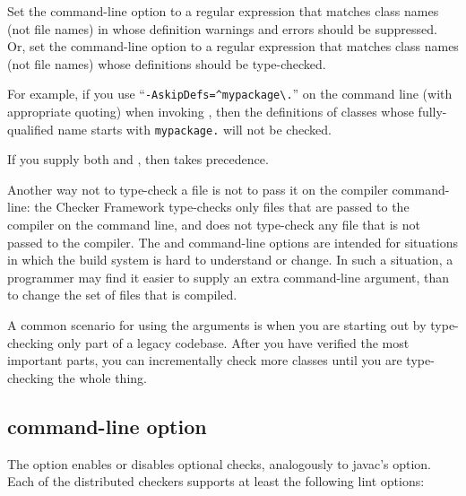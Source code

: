 Set the  command-line option to a
regular expression that matches class names (not file names) in whose definition warnings and errors
should be suppressed.
Or, set the  command-line option to a
regular expression that matches class names (not file names) whose
definitions should be type-checked.

For example, if you use
``{\codesize\verb|-AskipDefs=^mypackage\.|}'' on the command line
(with appropriate quoting) when invoking
, then the definitions of 
classes whose fully-qualified name starts with \codesize\verb|mypackage.|
will not be checked.

If you supply both  and , then
 takes precedence.

Another way not to type-check a file is not to pass it on the compiler
command-line:  the Checker Framework type-checks only files that are passed
to the compiler on the command line, and does not type-check any file that
is not passed to the compiler.  The  and 
command-line options
are intended for situations in which the build system is hard to understand
or change.  In such a situation, a programmer may find it easier to supply
an extra command-line argument, than to change the set of files that is
compiled.

A common scenario for using the arguments is when you are starting out by
type-checking only part of a legacy codebase.  After you have verified the
most important parts, you can incrementally check more classes until you
are type-checking the whole thing.


\subsection{ command-line option\label{alint}}

\label{lint-options}

The  option enables or disables optional checks, analogously to
javac's  option.
Each of the distributed checkers supports at least the following lint options:




